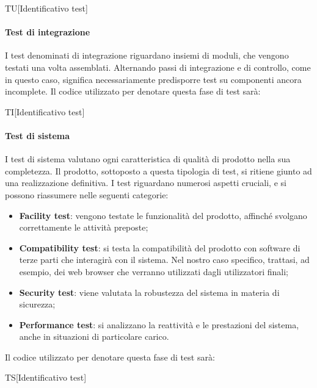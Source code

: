 		\begin{center}
			TU[Identificativo test]
		\end{center}
	
		\paragraph{Test di integrazione}
		I test denominati di integrazione riguardano insiemi di moduli, che vengono testati una volta assemblati. Alternando passi di integrazione e di controllo, come in questo caso, significa necessariamente predisporre test su componenti ancora incomplete. Il codice utilizzato per denotare questa fase di test sarà:
		
		\begin{center}
			TI[Identificativo test]
		\end{center}
		
		\paragraph{Test di sistema}
		I test di sistema valutano ogni caratteristica di qualità di prodotto nella sua completezza. Il prodotto, sottoposto a questa tipologia di test, si ritiene giunto ad una realizzazione definitiva. I test riguardano numerosi aspetti cruciali, e si possono riassumere nelle seguenti categorie:
		
		\begin{itemize}
			\item \textbf{Facility test}: vengono testate le funzionalità del prodotto, affinché svolgano correttamente le attività preposte;
			\item \textbf{Compatibility test}: si testa la compatibilità del prodotto con software di terze parti che interagirà con il sistema. Nel nostro caso specifico, trattasi, ad esempio, dei web browser che verranno utilizzati dagli utilizzatori finali;
			\item \textbf{Security test}: viene valutata la robustezza del sistema in materia di sicurezza;
			\item \textbf{Performance test}: si analizzano la reattività e le prestazioni del sistema, anche in situazioni di particolare carico.
		\end{itemize}
	
		Il codice utilizzato per denotare questa fase di test sarà:
		
		\begin{center}
			TS[Identificativo test]
		\end{center}
	
